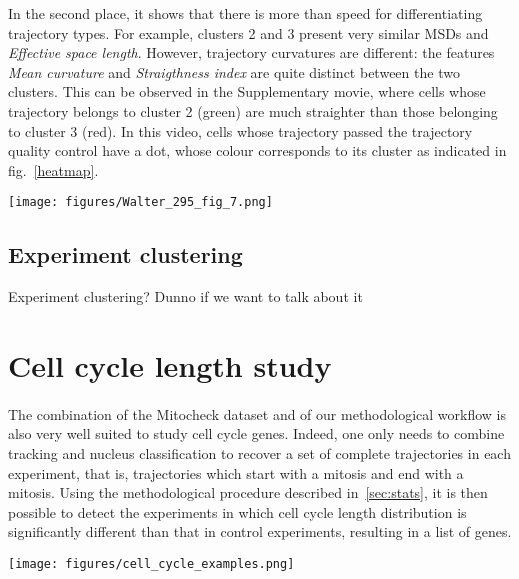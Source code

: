 In the second place, it shows that there is more than speed for differentiating trajectory types. For example, clusters 2 and 3 present very similar MSDs and \textit{Effective space length}. However, trajectory curvatures are different: the features \textit{Mean curvature} and \textit{Straigthness index} are quite distinct between the two clusters. This can be observed in the Supplementary movie, where cells whose trajectory belongs to cluster 2 (green) are much straighter than those belonging to cluster 3 (red). In this video, cells whose trajectory passed the trajectory quality control have a dot, whose colour corresponds to its cluster as indicated in fig.~\ref{heatmap}.

\begin{figure*}[t!]
\centerline{\texttt{[image: figures/Walter\_295\_fig\_7.png]}}
\caption{Characterization of our ontology of trajectories. Each column is a single cell trajectory ; trajectories are grouped by cluster label. 1,000 trajectories were randomly selected per trajectory cluster.}
\label{heatmap}
\end{figure*}
\subsection{Experiment clustering}
\label{Mito_classif}
Experiment clustering? Dunno if we want to talk about it\clearpage
\section{Cell cycle length study}
\label{sec:cellcycle}
\paragraph*{} The combination of the Mitocheck dataset and of our methodological workflow is also very well suited to study cell cycle genes. Indeed, one only needs to combine tracking and nucleus classification to recover a set of complete trajectories in each experiment, that is, trajectories which start with a mitosis and end with a mitosis. Using the methodological procedure described in~\ref{sec:stats}, it is then possible to detect the experiments in which cell cycle length distribution is significantly different than that in control experiments, resulting in a list of genes.
\begin{figure*}[ht!]
\centerline{\texttt{[image: figures/cell\_cycle\_examples.png]}}
\caption{Examples of object divisions from the Mitocheck dataset}
\label{cellcycle2}
\end{figure*}
